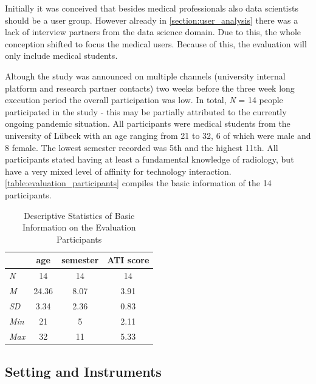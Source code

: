 \documentclass[11pt,a4paper,english]{scrreprt}
\begin{document}
Initially it was conceived that besides medical professionals also data scientists should be a user group. However already in \autoref{section:user_analysis} there was a lack of interview partners from the data science domain. Due to this, the whole conception shifted to focus the medical users. Because of this, the evaluation will only include medical students.

Altough the study was announced on multiple channels (university internal platform and research partner contacts) two weeks before the three week long execution period the overall participation was low. In total, \textit{N} = 14 people participated in the study - this may be partially attributed to the currently ongoing pandemic situation. All participants were medical students from the university of Lübeck with an age ranging from 21 to 32, 6 of which were male and 8 female. The lowest semester recorded was 5th and the highest 11th. All participants stated having at least a fundamental knowledge of radiology, but have a very mixed level of affinity for technology interaction. \autoref{table:evaluation_participants} compiles the basic information of the 14 participants.

\begin{table}[htbp]
    \centering
    \begin{tabularx}{0.45\textwidth}{ l c c c }
        \toprule
        & age & semester & ATI score \\
        \midrule
        \textit{N} & 14 & 14 & 14 \\
        \textit{M} & 24.36 & 8.07 & 3.91 \\
        \textit{SD} & 3.34 & 2.36 & 0.83 \\
        \textit{Min} & 21 & 5 & 2.11 \\
        \textit{Max} & 32 & 11 & 5.33 \\
        \bottomrule
    \end{tabularx}
    \caption{Descriptive Statistics of Basic Information on the Evaluation Participants}
    \label{table:evaluation_participants}
\end{table}

\subsection{Setting and Instruments}
\end{document}
